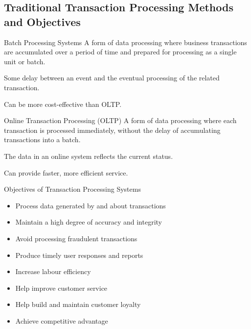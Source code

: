 \documentclass[\main/notes.tex]{subfiles}
\begin{document}
			\subsection{Traditional Transaction Processing Methods and Objectives}
				\begin{definition}{Batch Processing Systems}
					A form of data processing where business transactions are accumulated over a period of time and prepared for processing as a single unit or batch.

					Some delay between an event and the eventual processing of the related transaction.

					Can be more cost-effective than OLTP.
				\end{definition}
				\begin{definition}{Online Transaction Processing (OLTP)}
					A form of data processing where each transaction is processed immediately, without the delay of accumulating transactions into a batch.

					The data in an online system reflects the current status.

					Can provide faster, more efficient service.
				\end{definition}
				\begin{sidenote}{Objectives of Transaction Processing Systems}
					\begin{itemize}[nosep]
						\item Process data generated by and about transactions
						\item Maintain a high degree of accuracy and integrity
						\item Avoid processing fraudulent transactions
						\item Produce timely user responses and reports
						\item Increase labour efficiency
						\item Help improve customer service
						\item Help build and maintain customer loyalty
						\item Achieve competitive advantage
					\end{itemize}
				\end{sidenote}
\end{document}
